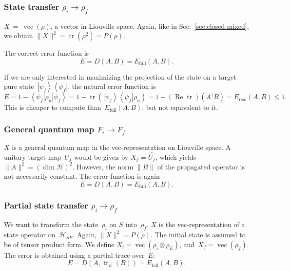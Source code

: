 \documentclass[aps, pra, a4paper, longbibliography, superscriptaddress]{revtex4-1}
\newcommand{\I}{\openone}
\newcommand{\be}{\begin{equation}}
\newcommand{\ee}{\end{equation}}
\newcommand{\eq}{\Leftrightarrow}
\newcommand{\ket}[1]{\left| #1 \right \rangle}
\newcommand{\bra}[1]{\left \langle #1 \right|}
\newcommand{\ketbra}[2]{\left| #1 \right \rangle \left \langle #2 \right|}
\newcommand{\hilb}[1]{\mathcal{#1}}
\DeclareMathOperator{\tr}{tr}
\DeclareMathOperator{\re}{Re}
\DeclareMathOperator{\cvec}{vec}
\newcommand{\vecop}[1]{\widehat{#1}}
\begin{document}




\subsubsection{State transfer $\rho_i \to \rho_f$}

$X~=~\cvec(\rho)$, a vector in Liouville space. Again, like in
Sec.~\ref{sec:closed-mixed}, we obtain
$\|X\|^2 = \tr(\rho^2) = P(\rho)$.

The correct error function is
\be
E
= D(A, B)
= E_\text{full}(A, B).
\ee

If we are only interested in maximizing the projection of
the state on a target pure state~$\ketbra{\psi_f}{\psi_f}$, the natural error
function is
\be
E
= 1 -\bra{\psi_f} \rho_n \ket{\psi_f}
= 1 -\tr\left(\ketbra{\psi_f}{\psi_f} \rho_n \right)
= 1 -(\re \tr)\left(A^\dagger B\right)
= E_\text{real}(A, B) \le 1.
\ee
This is cheaper to compute than~$E_\text{full}(A, B)$, but not equivalent to it.


\subsubsection{General quantum map $F_i \to F_f$}

$X$ is a general quantum map in the vec-representation on Liouville space.
A unitary target map~$U_f$ would be given by
$X_f = \vecop{U_f}$, which yields $\|A\|^2 = (\dim \hilb{H})^2$.
However, the norm $\|B\|$ of the propagated operator
is not necessarily constant. The error function is again
\be
E
= D(A, B)
= E_\text{full}(A, B).
\ee


\subsubsection{Partial state transfer $\rho_i \to \rho_f$}

We want to transform the state~$\rho_i$ on $S$ into~$\rho_f$.
$X$ is the vec-representation of a state operator on~$\hilb{H}_{SE}$.
Again, $\|X\|^2 = P(\rho)$.
The initial state is assumed to be of tensor product form.
We define $X_i = \cvec(\rho_i \otimes \rho_E)$,
and~$X_f = \cvec(\rho_f)$.
The error is obtained using a partial trace over~$E$:
\be
E
= D(A, \tr_E(B))
= E_\text{full}(A, B).
\ee
\end{document}
